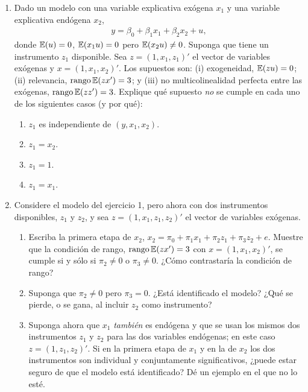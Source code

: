 \documentclass[letterpaper,11pt]{article}
\begin{document}
\begin{enumerate}[itemsep=0.8em]

\item Dado un modelo con una variable explicativa exógena $x_1$ y una variable explicativa
    endógena $x_2$,
    \begin{align*}
    y=\beta_0+\beta_1 x_1+\beta_2 x_2+u,
    \end{align*}
    donde $\operatorname{\mathbb{E}}(u)=0$, $\operatorname{\mathbb{E}}(x_1u)=0$ pero $\operatorname{\mathbb{E}}(x_2u)\neq0$. Suponga que tiene un instrumento $z_1$
    disponible. Sea $z=(1,x_1,z_1)'$ el vector de variables exógenas y $x=(1,x_1,x_2)'$. Los
    supuestos son: (i) exogeneidad, $\operatorname{\mathbb{E}}(zu)=0$; (ii) relevancia,
    $\operatorname{rango}\operatorname{\mathbb{E}}(zx')=3$; y (iii) no multicolinealidad perfecta entre las exógenas,
    $\operatorname{rango}\operatorname{\mathbb{E}}(zz')=3$. Explique qué supuesto \emph{no} se cumple en cada uno de los
    siguientes casos (y por qué):
    \begin{enumerate}
        \item $z_1$ es independiente de $(y,x_1,x_2)$.
        \item $z_1=x_2$.
        \item $z_1=1$.
        \item $z_1=x_1$.
    \end{enumerate}

\item Considere el modelo del ejercicio 1, pero ahora con dos instrumentos disponibles,
    $z_1$ y $z_2$, y sea $z=(1,x_1,z_1,z_2)'$ el vector de variables exógenas.
    \begin{enumerate}
        \item Escriba la primera etapa de $x_2$,
            $x_2=\pi_{0}+\pi_{1}x_1+\pi_{2}z_1+\pi_{3}z_2+e$. Muestre que la condición de rango,
            $\operatorname{rango}\operatorname{\mathbb{E}}(zx')=3$ con $x=(1,x_1,x_2)'$, se cumple si y sólo si
            $\pi_2\neq0$ o $\pi_3\neq0$. ¿Cómo contrastaría la condición de rango?
        \item Suponga que $\pi_2\neq0$ pero $\pi_3=0$. ¿Está identificado el modelo? ¿Qué se
            pierde, o se gana, al incluir $z_2$ como instrumento?
        \item Suponga ahora que $x_1$ \emph{también} es endógena y que se usan los mismos dos
            instrumentos $z_1$ y $z_2$ para las dos variables endógenas; en este caso
            $z=(1,z_1,z_2)'$. Si en la primera etapa de $x_1$ y en la de $x_2$ los dos
            instrumentos son individual y conjuntamente significativos, ¿puede estar seguro de
            que el modelo está identificado? Dé un ejemplo en el que no lo esté.
    \end{enumerate}


\end{enumerate}
\end{document}
